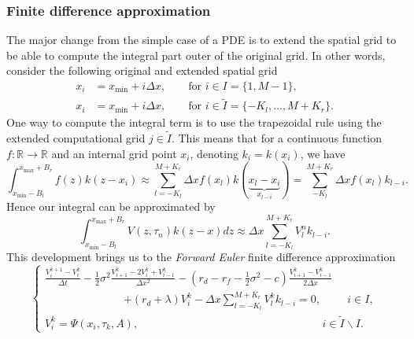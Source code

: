\subsubsection{Finite difference approximation}
The major change from the simple case of a PDE is to extend the spatial grid to be able to compute the integral part outer of the original grid. In other words, consider the following original and extended spatial grid
\begin{align*}
x_i &= x_{\min}+ i\Delta x, \qquad\text{for } i \in I = \{1,M-1\},\\
x_i &= x_{\min}+i\Delta x, \qquad\text{for } i \in \tilde{I}=\{-K_l, \ldots, M + K_r\}.
\end{align*}
One way to compute the integral term is to use the trapezoidal rule using the extended computational grid $j\in \tilde{I}$. This means that for a continuous function $f:\mathbb{R}\to\mathbb{R}$ and an internal grid point $x_i$, denoting $k_i= k(x_i)$, we have
$$\int_{x_{\min}-B_l}^{x_{\max}+B_r} f(z) k(z-x_i) \approx \sum_{l=-K_l}^{M+K_r}\Delta x f(x_l)k(\underbrace{x_l-x_i}_{x_{l-i}})=\sum_{-K_l}^{M+K_r}\Delta x f(x_l)k_{l-i}.$$
Hence our integral can be approximated by
$$\int_{x_{\min}-B_l}^{x_{\max}+B_r} V(z,\tau_n)k(z-x)dz\approx \Delta x \sum_{l=-K_l}^{M+K_r} V^n_l k_{l-i}.$$
This development brings us to the \textit{Forward Euler} finite difference approximation
$$\begin{cases}
\displaystyle{\frac{V_i^{k+1}-V_i^k}{\Delta t}-\frac{1}{2}\sigma^2\frac{V_{i+1}^k-2V_i^k+V_{i-1}^k}{\Delta x^2}-\left(r_d-r_f-\frac{1}{2}\sigma^2-c\right)\frac{V_{i+1}^k-V_{i-1}^k}{2\Delta x}} \\
\hspace{3cm}\displaystyle{+(r_d + \lambda) V_i^k
-\Delta x \sum_{l=-K_l}^{M+K_r}V_l^k k_{l-i} = 0}, \hspace{1cm} i \in I,\\
V_i^k = \Psi(x_i,\tau_k,A), \hspace{7cm} i\in\tilde{I}\backslash I.
\end{cases}$$

